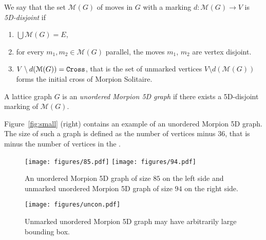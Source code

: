 \begin{definition}
\label{def:disjoint}
    We say that the set $\mathcal{M}(G)$ of moves in $G$ with a marking $d \colon \mathcal{M}(G) \to V$ is \emph{5D-disjoint} if
      \begin{enumerate}
        \item $\bigcup \mathcal{M}(G) = E$,
        \item for every $m_1, m_2 \in \mathcal{M}(G)$ parallel, the moves $m_1$, $m_2$ are vertex disjoint.
        \item $V \setminus d(\mathcal{M}(G)) = \texttt{Cross}$, that is the set of unmarked vertices $V \setminus d(\mathcal{M}(G))$ forms the initial cross of Morpion Solitaire. \label{markings}
      \end{enumerate}
\end{definition}

\begin{definition}
  A lattice graph $G$ is an \emph{unordered Morpion 5D graph} if there exists a 5D-disjoint marking of $\mathcal{M}(G)$. 
\end{definition}

Figure~\ref{fig:small} (right) contains an example of an unordered Morpion 5D graph. %
 The size of such a graph  is defined as the number of vertices minus $36$, that is minus the number of vertices in the \Cross. %

\begin{figure}[h]
    \texttt{[image: figures/85.pdf]}
    \texttt{[image: figures/94.pdf]}
    \caption{\label{fig:85}
      An unordered Morpion 5D graph of size $85$ on the left side
        and unmarked unordered Morpion 5D graph of size $94$ on the right side. 
    }
\end{figure}

\begin{figure}
  \centering
  \texttt{[image: figures/uncon.pdf]}
  \caption{
    Unmarked unordered Morpion 5D graph may have arbitrarily large bounding box.
  }
  \label{fig:uncon}
\end{figure}

